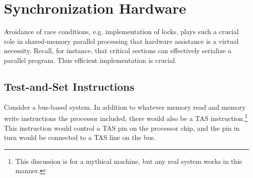 %
%
%
%
%



\section{Synchronization Hardware}

Avoidance of race conditions, e.g. implementation of locks, plays such a
crucial role in shared-memory parallel processing that hardware
assistance is a virtual necessity.  Recall, for instance, that critical
sections can effectively serialize a parallel program.  Thus efficient
implementation is crucial.

\subsection{Test-and-Set Instructions}

Consider a bus-based system. In addition to whatever memory read and
memory write instructions the processor included, there would also be a
TAS instruction.\footnote{This discussion is for a mythical machine, but
any real system works in this manner.}  This instruction would control a
TAS pin on the processor chip, and the pin in turn would be connected to
a TAS line on the bus.

